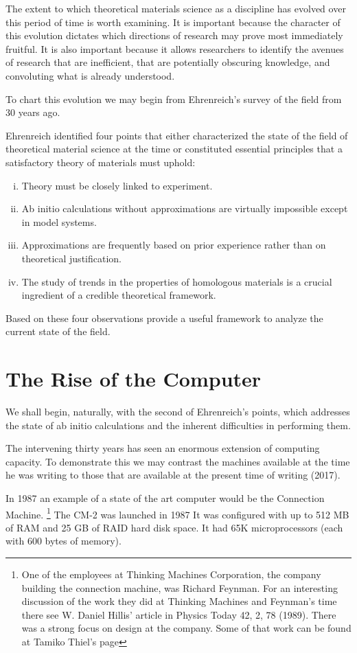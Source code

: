 The extent to which theoretical materials science as a discipline has evolved over this period of time is worth examining. 
It is important because the character of this evolution dictates which directions of research may prove most
immediately fruitful. It is also important because it allows researchers to identify the avenues
of research that are inefficient, that are potentially obscuring knowledge, and convoluting 
what is already understood. 

To chart this evolution we may begin from Ehrenreich's survey of the field from 30 years ago.

Ehrenreich identified four points that either characterized the state 
of the field of theoretical material science at the time or constituted essential principles 
that a satisfactory theory of materials must uphold:
%
\begin{enumerate}[i)]
\item Theory must be closely linked to experiment.
\item Ab initio calculations without approximations are virtually impossible except in model systems.
\item Approximations are frequently based on prior experience rather than on theoretical justification.
\item The study of trends in the properties of homologous materials 
      is a crucial ingredient of a credible theoretical framework.
\end{enumerate}
%
Based on these four observations provide a useful framework to 
analyze the current state of the field.

\section{The Rise of the Computer}
\label{sec:riseofcomp}
We shall begin, naturally, with the second of Ehrenreich's points, 
which addresses the state of ab initio calculations
and the inherent difficulties in performing them. 

The intervening thirty years has seen an enormous extension of computing capacity. 
To demonstrate this we may contrast the machines available at the time
he was writing to those that are available at the present time of writing (2017). 

In 1987 an example of a state of the art computer would be the Connection Machine.
\footnote{One of the employees at Thinking Machines Corporation,
the company building the connection machine, was Richard Feynman.
For an interesting discussion of the work they
did at Thinking Machines and Feynman's time there see W. Daniel
Hillis' article in Physics Today 42, 2, 78 (1989).
There was a strong focus on design at the company. Some of that
work can be found at Tamiko Thiel's page}%
The CM-2 was launched in 1987 It was configured with up to 512 MB of RAM and 25 GB of RAID
hard disk space. It had 65K microprocessors (each with 600 bytes of memory). 

